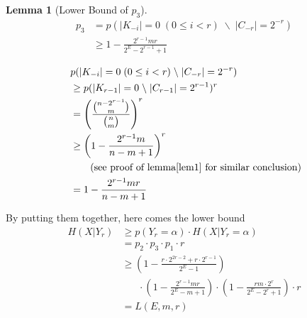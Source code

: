 \documentclass[10pt, conference, compsocconf]{IEEEtran}
\newtheorem{mylemma}{Lemma}
\begin{document}
        \begin{mylemma}[Lower Bound of $p_3$]
            \begin{align*}
            p_3 &= p(|K_{-i}| = 0    \; (0 \leq i < r) \; \backslash \; |C_{-r}| = 2^{-r}) \\
                &\geq 1-\frac{2^{r-1}mr}{2^E-2^{r-1}+1}
            \end{align*}
        \end{mylemma}

        \begin{IEEEproof}
            \begin{align*}
                &p(|K_{-i}| = 0    \; (0 \leq i < r) \; \backslash \; |C_{-r}| = 2^{-r}) \\\
                    &\geq p(|K_{r-1}| = 0 \; \backslash \; |C_{r-1}| = 2^{r-1})^r\\
                    &= \left(\frac{\binom{n-2^{r-1}}{m}}{\binom{n}{m}} \right)^r\\
                    &\geq \left(1-\frac{2^{r-1}m}{n-m+1}\right)^r   \; \\
                    & \;\;\;\;\;\; \text{ (see proof of lemma\ref{lem1} for similar conclusion})\\
                    &= 1-\frac{2^{r-1}m r}{n-m+1}
            \end{align*}
        \end{IEEEproof}

        By putting them together, here comes the lower bound
        \begin{align*}
            H(X | Y_r) &\geq p(Y_r = \alpha) \cdot H(X | Y_r = \alpha)\\
                &= p_2 \cdot p_3 \cdot p_1 \cdot r\\
                &\geq (1-\frac{r \cdot 2^{2r-2}+r \cdot 2^{r-1}}{2^E-1})\\
                    &\;\;\;\;\;\; \cdot (1-\frac{2^{r-1}m r}{2^E-m+1})
                    \cdot (1-\frac{r m \cdot 2^r}{2^E-2^r+1}) \cdot r \\
                &= L(E, m, r)
        \end{align*}
\end{document}
